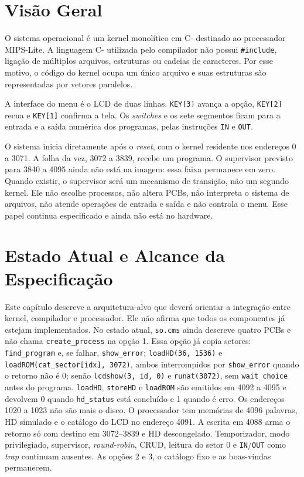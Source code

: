 \documentclass[
    12pt,
    openright,
    a4paper,
    english,
    brazilian
]{abntex2}
\begin{document}
\section{Visão Geral}

O sistema operacional é um kernel monolítico em C- destinado ao processador MIPS-Lite. A linguagem C- utilizada pelo compilador não possui \texttt{\#include}, ligação de múltiplos arquivos, estruturas ou cadeias de caracteres. Por esse motivo, o código do kernel ocupa um único arquivo e suas estruturas são representadas por vetores paralelos.

A interface do menu é o LCD de duas linhas. \texttt{KEY[3]} avança a opção, \texttt{KEY[2]} recua e \texttt{KEY[1]} confirma a tela. Os \emph{switches} e os sete segmentos ficam para a entrada e a saída numérica dos programas, pelas instruções \texttt{IN} e \texttt{OUT}.

O sistema inicia diretamente após o \emph{reset}, com o kernel residente nos endereços 0 a 3071. A folha da vez, 3072 a 3839, recebe um programa. O supervisor previsto para 3840 a 4095 ainda não está na imagem: essa faixa permanece em zero. Quando existir, o supervisor será um mecanismo de transição, não um segundo kernel. Ele não escolhe processos, não altera PCBs, não interpreta o sistema de arquivos, não atende operações de entrada e saída e não controla o menu. Esse papel continua especificado e ainda não está no hardware.

\section{Estado Atual e Alcance da Especificação}

Este capítulo descreve a arquitetura-alvo que deverá orientar a integração entre kernel, compilador e processador. Ele não afirma que todos os componentes já estejam implementados. No estado atual, \texttt{so.cms} ainda descreve quatro PCBs e não chama \texttt{create\_process} na opção 1. Essa opção já copia setores: \texttt{find\_program} e, se falhar, \texttt{show\_error}; \texttt{loadHD(36, 1536)} e \texttt{loadROM(cat\_sector[idx], 3072)}, ambos interrompidos por \texttt{show\_error} quando o retorno não é 0; senão \texttt{lcdshow(3, id, 0)} e \texttt{runat(3072)}, sem \texttt{wait\_choice} antes do programa. \texttt{loadHD}, \texttt{storeHD} e \texttt{loadROM} são emitidos em 4092 a 4095 e devolvem 0 quando \texttt{hd\_status} está concluído e 1 quando é erro. Os endereços 1020 a 1023 não são mais o disco. O processador tem memórias de 4096 palavras, HD simulado e o catálogo do LCD no endereço 4091. A escrita em 4088 arma o retorno só com destino em 3072--3839 e HD descongelado. Temporizador, modo privilegiado, supervisor, \emph{round-robin}, CRUD, leitura do setor 0 e \texttt{IN}/\texttt{OUT} como \emph{trap} continuam ausentes. As opções 2 e 3, o catálogo fixo e as boas-vindas permanecem.
\end{document}
